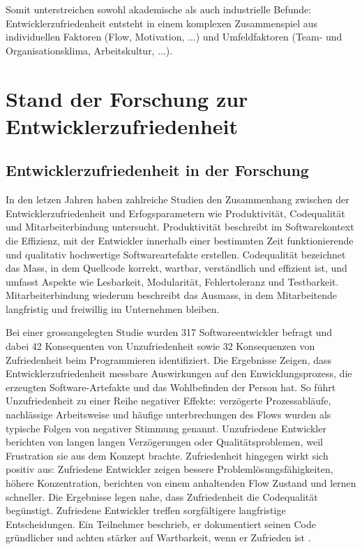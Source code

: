 \documentclass[12pt,a4paper]{report}
\begin{document}
Somit unterstreichen sowohl akademische als auch industrielle Befunde: Entwicklerzufriedenheit entsteht in einem komplexen
Zusammenspiel aus individuellen Faktoren (Flow, Motivation, ...) und Umfeldfaktoren (Team- und Organisationsklima, Arbeitskultur, 
...).

\section{Stand der Forschung zur Entwicklerzufriedenheit}

\subsection{Entwicklerzufriedenheit in der Forschung}

In den letzen Jahren haben zahlreiche Studien den Zusammenhang zwischen der Entwicklerzufriedenheit und Erfogsparametern wie 
Produktivität, Codequalität und Mitarbeiterbindung untersucht. Produktivität beschreibt im Softwarekontext die Effizienz, mit der
Entwickler innerhalb einer bestimmten Zeit funktionierende und qualitativ hochwertige Softwareartefakte erstellen. Codequalität
bezeichnet das Mass, in dem Quellcode korrekt, wartbar, verständlich und effizient ist, und umfasst Aspekte wie Lesbarkeit,
Modularität, Fehlertoleranz und Testbarkeit. Mitarbeiterbindung wiederum beschreibt das Ausmass, in dem Mitarbeitende langfristig
und freiwillig im Unternehmen bleiben.

Bei einer grossangelegten Studie wurden 317 Softwareentwickler befragt und dabei 42 Konsequenten von Unzufriedenheit sowie
32 Konsequenzen von Zufriedenheit beim Programmieren identifiziert. Die Ergebnisse Zeigen, dass Entwicklerzufriedenheit messbare
Auswirkungen auf den Enwicklungsprozess, die erzeugten Software-Artefakte und das Wohlbefinden der Person hat. So führt
Unzufriedenheit zu einer Reihe negativer Effekte: verzögerte Prozessabläufe, nachlässige Arbeitsweise und häufige unterbrechungen
des Flows wurden als typische Folgen von negativer Stimmung genannt. Unzufriedene Entwickler berichten von langen langen
Verzögerungen oder Qualitätsproblemen, weil Frustration sie aus dem Konzept brachte. Zufriedenheit hingegen wirkt sich positiv
aus: Zufriedene Entwickler zeigen bessere Problemlösungsfähigkeiten, höhere Konzentration, berichten von einem anhaltenden Flow
Zustand und lernen schneller. Die Ergebnisse legen nahe, dass Zufriedenheit die Codequalität begünstigt. Zufriedene Entwickler
treffen sorgfältigere langfristige Entscheidungen. Ein Teilnehmer beschrieb, er dokumentiert seinen Code gründlicher und achten
stärker auf Wartbarkeit, wenn er Zufrieden ist \cite{graziotin_what_2018}.
\end{document}
